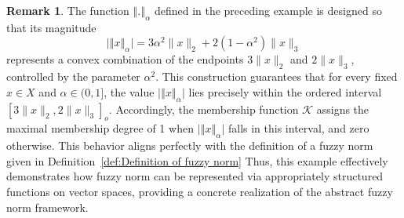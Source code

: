 \documentclass[preprint,12pt]{elsarticle}
\newcommand{\norm}[1]{\left\Vert#1\right\Vert}
\theoremstyle{definition}
\newtheorem{remark}{Remark}[section]
\begin{document}
\begin{remark}
	The function \(\norm{.}_\alpha\) defined in the preceding example is designed so that its magnitude 
	\[
\big\vert\norm{x}_\alpha \big\vert = 3 \alpha^2 \|x\|_2 + 2 (1 - \alpha^2) \|x\|_3
	\]
	represents a convex combination of the endpoints \(3\|x\|_2\) and \(2\|x\|_3\), controlled by the parameter \(\alpha^2\). This construction guarantees that for every fixed \(x \in X\) and \(\alpha \in (0,1]\), the value \(\big\vert\norm{x}_\alpha \big\vert\) lies precisely within the ordered interval \([3\|x\|_2, 2\|x\|_3]_o\). Accordingly, the membership function \(\mathcal{K}\) assigns the maximal membership degree of 1 when \(\big\vert\norm{x}_\alpha \big\vert\) falls in this interval, and zero otherwise. This behavior aligns perfectly with the definition of a fuzzy norm given in Definition~\ref{def:Definition of fuzzy norm} Thus, this example effectively demonstrates how fuzzy norm can be represented via appropriately structured functions on vector spaces, providing a concrete realization of the abstract fuzzy norm framework.
\end{remark}
\end{document}

